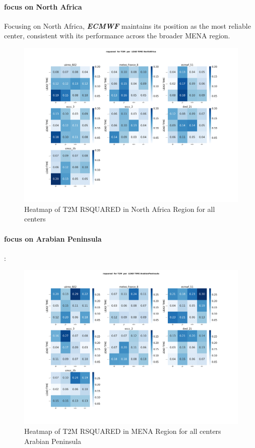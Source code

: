 \paragraph{focus on North Africa}

Focusing on North Africa, \textbf{\textit{ECMWF}} maintains its position as the most reliable center, consistent with its performance across the broader MENA region.
\begin{figure}[H]
\includegraphics[scale=0.3]{plots/det/rsquared/rsquared_T2M_NorthAfrica.png}
\caption{Heatmap of T2M  RSQUARED in North Africa Region for all centers }
\end{figure}


\vspace{1.5cm}
\paragraph{focus on Arabian Peninsula}:


\begin{figure}[H]
\includegraphics[scale=0.3]{plots/det/rsquared/rsquared_T2M_ArabianPeninsula.png}
\caption{Heatmap of T2M  RSQUARED in MENA Region for all centers Arabian Peninsula}
\end{figure}


